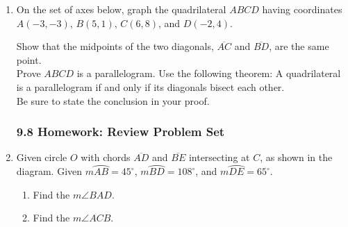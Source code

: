\documentclass[12pt, twoside]{article}
\begin{document}
\begin{enumerate}
\newpage
\item On the set of axes below, graph the quadrilateral $ABCD$ having coordinates $A(-3,-3)$, $B(5,1)$, $C(6,8)$, and $D(-2,4)$.
    \begin{center} %
    \end{center}
    Show that the midpoints of the two diagonals, $\overline{AC}$ and $\overline{BD}$, are the same point. \\[5cm]
    Prove $ABCD$ is a parallelogram. Use the following theorem:
    A quadrilateral is a parallelogram if and only if its diagonals bisect each other. \\[0.5cm]
    Be sure to state the conclusion in your proof.

\newpage
\subsubsection*{9.8 Homework: Review Problem Set}
\item Given circle $O$ with chords $\overline{AD}$ and $\overline{BE}$ intersecting at $C$, as shown in the diagram. Given $m \wideparen{AB}=45^\circ$, $m \wideparen{BD}=108^\circ$, and $m \wideparen{DE}=65^\circ$.
  \begin{multicols}{2}
  \raggedcolumns
  \begin{enumerate}
    \item Find the $m\angle BAD$. \vspace{1.7cm}
    \item Find the $m\angle ACB$. \vspace{2cm}
  \end{enumerate}
  \end{multicols}


\end{enumerate}
\end{document}
